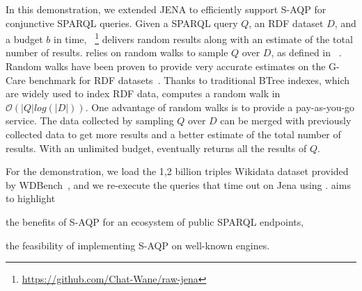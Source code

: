 
In this demonstration, we extended JENA to efficiently support S-AQP for conjunctive 
SPARQL queries. Given a SPARQL query $Q$, an RDF dataset $D$, and a budget $b$ in time,
\NAME~\footnote{\url{https://github.com/Chat-Wane/raw-jena}} delivers random results along with an estimate of the
total number of results. \NAME relies on random walks to sample $Q$ over $D$, as defined in
\WANDER~\cite{li2019wanderjoin}. Random walks have been proven to provide very accurate estimates
on the G-Care benchmark for RDF datasets~\cite{DBLP:conf/sigmod/ParkKBKHH20}. Thanks to 
traditional BTree indexes, which are widely used to index RDF data, \NAME computes a random
walk in $\mathcal{O}(|Q|log(|D|))$. 
%
%
One advantage of random walks is to provide a pay-as-you-go service. %
The data collected by sampling $Q$ over $D$ can be merged with previously collected
data to get more results and a better estimate of the total number of results. With an
unlimited budget, \NAME eventually returns all the results of $Q$.


For the demonstration, we load the 1,2 billion triples Wikidata dataset
provided by WDBench~\cite{angles2022wdbench}, and
we re-execute the queries that time out on Jena using \NAME. %
%
\NAME aims to highlight
\begin{inparaenum}[(i)]
\item the benefits of S-AQP for an ecosystem of public SPARQL endpoints,
\item the feasibility of implementing S-AQP on well-known engines.
\end{inparaenum}


